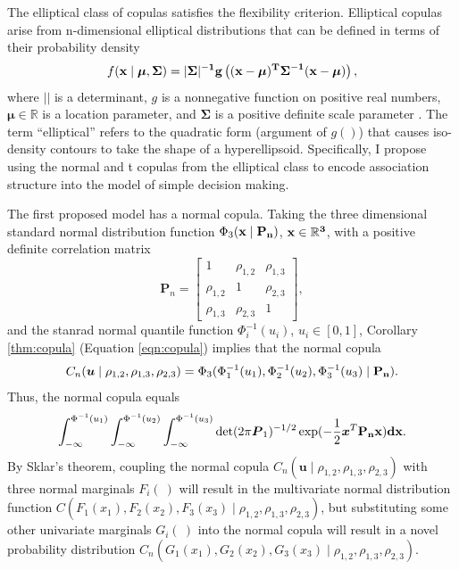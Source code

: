 \documentclass[12pt]{article}
\begin{document}
The elliptical class of
copulas satisfies the flexibility criterion. Elliptical copulas arise from n-dimensional elliptical distributions that can be defined in terms of their probability density
\begin{equation}
f(\bf{x} \mid \boldsymbol{\mu}, \boldsymbol{\Sigma}) = |\boldsymbol{\Sigma}|^{-1}g \left((x - \boldsymbol{\mu})^T\boldsymbol{\Sigma}^{-1}(x - \boldsymbol{\mu})\right),
\end{equation}
where $| |$ is a determinant, $g$ is a nonnegative function on positive real numbers, $\boldsymbol{\mu} \in \mathbb{R}$ is a location parameter, and $\boldsymbol{\Sigma}$ is a positive definite scale parameter \citep{Joe1997,Nel2007}. The term ``elliptical'' refers to the quadratic form (argument of $g()$) that causes iso-density contours to take the shape of a hyperellipsoid.
Specifically, I propose
using the normal and t copulas from the elliptical class to encode
association structure into the model of simple decision making. 

The first proposed model has a normal copula. Taking the three dimensional standard normal distribution function  $\Phi_3(\bf{x} \mid \bf{P_n})$, $\bf{x} \in \mathbb{R}^3$, with a positive definite correlation matrix 
%
\begin{equation}
\boldsymbol{P}_n = \left[ \begin{array}{ccc}
1 & \rho_{1, 2} & \rho_{1, 3} \\
\rho_{1, 2} & 1 & \rho_{2, 3} \\
\rho_{1, 3} & \rho_{2, 3} & 1
\end{array}
\right], \nonumber
\end{equation}
%
and the stanrad normal quantile function $\Phi_i^{-1}(u_i)$, $u_i \in [0, 1]$, Corollary \ref{thm:copula} (Equation \ref{eqn:copula}) implies that the normal copula 
%
\begin{equation}
C_n (\boldsymbol{u} \mid \rho_{1,2},\rho_{1,3},\rho_{2,3}) 
  = \Phi_3(\Phi_1^{-1}(u_1),
               \Phi_2^{-1}(u_2),
               \Phi_3^{-1}(u_3) \mid \bf{P}_n).
\end{equation}
%
Thus, the normal copula equals
%
\begin{eqnarray}
\int_{-\infty}^{\Phi^{-1}(u_1)} \int_{-\infty}^{\Phi^{-1}(u_2)} 
        \int_{-\infty}^{\Phi^{-1}(u_3)} 
        \det(2\pi\boldsymbol{P}_1)^{-1 / 2}\exp(-\frac{1}{2}\boldsymbol{x}^T
\bf{P}_n \bf{x})d\bf{x}.
\end{eqnarray}
%
By Sklar's theorem, coupling the normal copula $C_n (\boldsymbol{u} \mid \rho_{1,2},\rho_{1,3},\rho_{2,3})$ with three normal
marginals $F_i(\:)$ will result in the
multivariate normal distribution function $C(F_1(x_1), F_2(x_2), F_3(x_3) \mid \rho_{1,2},\rho_{1,3},\rho_{2,3})$, but substituting some other univariate marginals $G_i(\:)$ into
the normal copula will result in a novel probability distribution $C_n(G_1(x_1), G_2(x_2), G_3(x_3) \mid \rho_{1,2},\rho_{1,3},\rho_{2,3})$.
\end{document}
